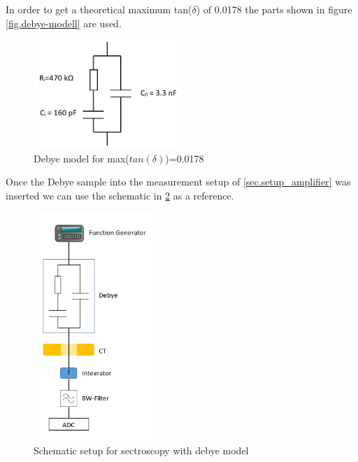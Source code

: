 In order to get a theoretical maximum tan($\delta$) of 0.0178 the parts shown in figure \ref{fig.debye-modell} are used. 
\begin{figure}[h!tb]
	\centerline{\includegraphics[width=0.5\textwidth]{figures/Method/debye-modell.jpg}}	
	\caption{Debye model for max($tan(\delta)$)=0.0178 }	
	\label{fig.debye-modellsch}
\end{figure}

Once the Debye sample into the measurement setup of \ref{sec.setup_amplifier} was inserted we can use the schematic in \ref{fig.presentation} as a reference.

\begin{figure}[h!tb]
	\centerline{\includegraphics[width=0.4\textwidth]{figures/Method/setup/low_voltage_setup.png}}	
	\caption{Schematic setup for sectroscopy with debye model}	
	\label{fig.presentation}
\end{figure}

